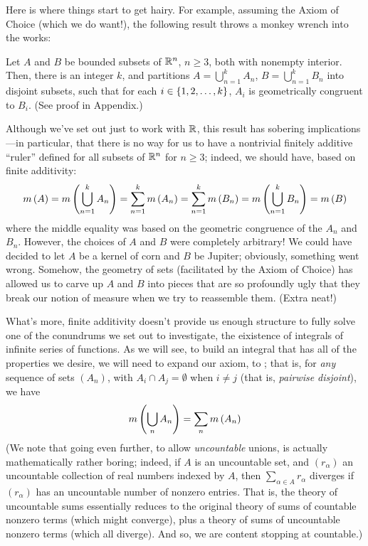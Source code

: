 Here is where things start to get hairy. For example, assuming the Axiom of Choice (which we do want!), the following result throws a monkey wrench into the works:

\begin{claim}
Let $A$ and $B$ be bounded subsets of $\mathbb{R}^n$, $n \geq 3$, both with nonempty interior. Then, there is an integer $k$, and partitions $A = \bigcup_{n=1}^k A_n$, $B = \bigcup_{n=1}^k B_n$ into disjoint subsets, such that for each $i \in \left\{1,2,\ldots,k\right\}$, $A_i$ is geometrically congruent to $B_i$. (See proof in Appendix.)
\end{claim}

Although we've set out just to work with $\mathbb{R}$, this result has sobering implications---in particular, that there is no way for us to have a nontrivial finitely additive ``ruler'' defined for all subsets of $\mathbb{R}^n$ for $n \geq 3$; indeed, we should have, based on finite additivity:
\[ m\left( A \right) = m\left( \bigcup_{n=1}^k A_n \right) = \sum_{n=1}^k m\left( A_n \right) = \sum_{n=1}^k m\left( B_n \right) = m\left( \bigcup_{n=1}^k B_n \right) = m\left( B \right) \]
where the middle equality was based on the geometric congruence of the $A_n$ and $B_n$. However, the choices of $A$ and $B$ were completely arbitrary! We could have decided to let $A$ be a kernel of corn and $B$ be Jupiter; obviously, something went wrong. Somehow, the geometry of sets (facilitated by the Axiom of Choice) has allowed us to carve up $A$ and $B$ into pieces that are so profoundly ugly that they break our notion of measure when we try to reassemble them. (Extra neat!)

What's more, finite additivity doesn't provide us enough structure to fully solve one of the conundrums we set out to investigate, the eixistence of integrals of infinite series of functions. As we will see, to build an integral that has all of the properties we desire, we will need to expand our axiom, to ; that is, for \emph{any} sequence of sets $(A_n)$, with $A_i \cap A_j = \emptyset$ when $i \neq j$ (that is, \emph{pairwise disjoint}), we have
\[ m\left( \bigcup_{n} A_n \right) = \sum_n m\left( A_n \right) \]
(We note that going even further, to allow \emph{uncountable} unions, is actually mathematically rather boring; indeed, if $A$ is an uncountable set, and $(r_\alpha)$ an uncountable collection of real numbers indexed by $A$, then $\sum_{\alpha \in A} r_\alpha$ diverges if $(r_\alpha)$ has an uncountable number of nonzero entries. That is, the theory of uncountable sums essentially reduces to the original theory of sums of countable nonzero terms (which might converge), plus a theory of sums of uncountable nonzero terms (which all diverge). And so, we are content stopping at countable.)

